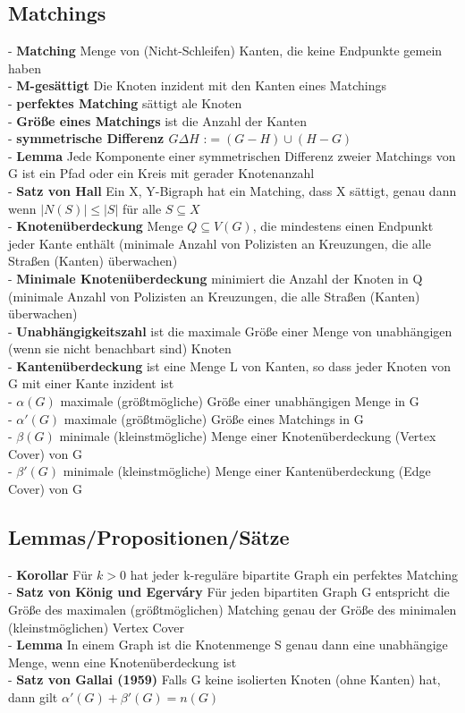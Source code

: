 \documentclass{article}
\begin{document}
\begin{multicols*}{3}
\section{Matchings}
    - \textbf{Matching} Menge von (Nicht-Schleifen) Kanten, die keine Endpunkte gemein haben
    \\- \textbf{M-gesättigt} Die Knoten inzident mit den Kanten eines Matchings
    \\- \textbf{perfektes Matching} sättigt ale Knoten
    \\- \textbf{Größe eines Matchings} ist die Anzahl der Kanten
    \\- \textbf{symmetrische Differenz $G \Delta H$} :$= (G - H) \cup (H - G)$
    \\- \textbf{Lemma} Jede Komponente einer symmetrischen Differenz zweier Matchings von G ist ein Pfad oder ein Kreis mit gerader Knotenanzahl
    \\- \textbf{Satz von Hall} Ein X, Y-Bigraph hat ein Matching, dass X sättigt, genau dann wenn $|N(S)| \leq |S|$ für alle $S \subseteq X$
    \\- \textbf{Knotenüberdeckung} Menge $Q \subseteq V(G)$, die mindestens einen Endpunkt jeder Kante enthält (minimale Anzahl von Polizisten an Kreuzungen, die alle Straßen (Kanten) überwachen)
    \\- \textbf{Minimale Knotenüberdeckung} minimiert die Anzahl der Knoten in Q (minimale Anzahl von Polizisten an Kreuzungen, die alle Straßen (Kanten) überwachen)
    \\- \textbf{Unabhängigkeitszahl} ist die maximale Größe einer Menge von unabhängigen (wenn sie nicht benachbart sind) Knoten
    \\- \textbf{Kantenüberdeckung} ist eine Menge L von Kanten, so dass jeder Knoten von G mit einer Kante inzident ist
    \\- \textbf{$\alpha(G)$} maximale (größtmögliche) Größe einer unabhängigen Menge in G
    \\- \textbf{$\alpha'(G)$} maximale (größtmögliche) Größe eines Matchings in G
    \\- \textbf{$\beta(G)$} minimale (kleinstmögliche) Menge einer Knotenüberdeckung (Vertex Cover) von G
    \\- \textbf{$\beta'(G)$} minimale (kleinstmögliche) Menge einer Kantenüberdeckung (Edge Cover) von G
    \subsection{Lemmas/Propositionen/Sätze}
        - \textbf{Korollar} Für $k > 0$ hat jeder k-reguläre bipartite Graph ein perfektes Matching
        \\ - \textbf{Satz von König und Egerváry} Für jeden bipartiten Graph G entspricht die Größe des maximalen (größtmöglichen) Matching genau der Größe des minimalen (kleinstmöglichen) Vertex Cover
        \\ - \textbf{Lemma} In einem Graph ist die Knotenmenge S genau dann eine unabhängige Menge, wenn eine Knotenüberdeckung ist
        \\ - \textbf{Satz von Gallai (1959)} Falls G keine isolierten Knoten (ohne Kanten) hat, dann gilt $\alpha'(G) + \beta'(G) = n(G)$

\end{multicols*}
\end{document}
